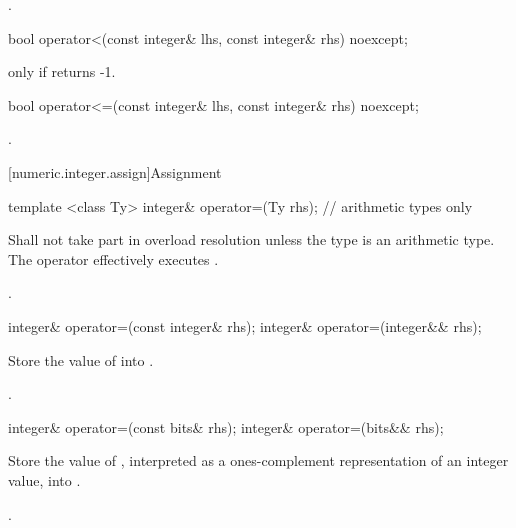 \begin{itemdescr}
\returns {}.		
\end{itemdescr}

\begin{itemdecl}
bool operator<(const integer& lhs, const integer& rhs) noexcept;	
\end{itemdecl}

\begin{itemdescr}
\returns {} only if  returns -1.		
\end{itemdescr}

\begin{itemdecl}
bool operator<=(const integer& lhs, const integer& rhs) noexcept;	
\end{itemdecl}

\begin{itemdescr}
\returns {}.		
\end{itemdescr}

[numeric.integer.assign]{Assignment}

\begin{itemdecl}
template <class Ty>
  integer& operator=(Ty rhs);   // arithmetic types only	
\end{itemdecl}

\begin{itemdescr}
\effects Shall not take part in overload resolution unless the type  is an arithmetic type. The operator effectively executes .

\returns {}.		
\end{itemdescr}

\begin{itemdecl}
integer& operator=(const integer& rhs);
integer& operator=(integer&& rhs);	
\end{itemdecl}

\begin{itemdescr}
\effects Store the value of  into .

\returns {}.		
\end{itemdescr}

\begin{itemdecl}
integer& operator=(const bits& rhs);
integer& operator=(bits&& rhs);	
\end{itemdecl}

\begin{itemdescr}
\effects Store the value of , interpreted as a ones-complement representation of an integer value, into .

\returns {}.		
\end{itemdescr}

